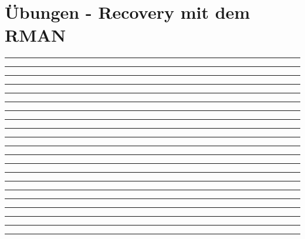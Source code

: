\section{Übungen - Recovery mit dem RMAN}
  \begin{enumerate}
    

      \rule{0.94\textwidth}{0.5pt}

      \rule{0.94\textwidth}{0.5pt}

      \rule{0.94\textwidth}{0.5pt}

      \rule{0.94\textwidth}{0.5pt}

    
    
    
    

      \rule{0.94\textwidth}{0.5pt}

      \rule{0.94\textwidth}{0.5pt}

      \rule{0.94\textwidth}{0.5pt}

      \rule{0.94\textwidth}{0.5pt}
\clearpage
    

      \rule{0.94\textwidth}{0.5pt}

      \rule{0.94\textwidth}{0.5pt}

      \rule{0.94\textwidth}{0.5pt}

      \rule{0.94\textwidth}{0.5pt}

    

      \rule{0.94\textwidth}{0.5pt}

      \rule{0.94\textwidth}{0.5pt}

      \rule{0.94\textwidth}{0.5pt}

    

      \rule{0.94\textwidth}{0.5pt}

      \rule{0.94\textwidth}{0.5pt}

      \rule{0.94\textwidth}{0.5pt}


    
    
    

      \rule{0.94\textwidth}{0.5pt}

      \rule{0.94\textwidth}{0.5pt}

      \rule{0.94\textwidth}{0.5pt}

    
  \end{enumerate}
\clearpage